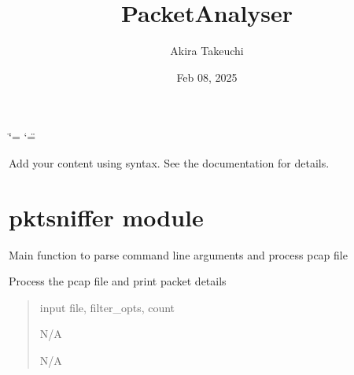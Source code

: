 \documentclass[letterpaper,10pt,english]{sphinxmanual}
\title{PacketAnalyser}
\date{Feb 08, 2025}
\author{Akira Takeuchi}
\begin{document}
\ifdefined\shorthandoff
  \ifnum\catcode`\=\string=\active\shorthandoff{=}\fi
  \ifnum\catcode`\"=\active{}\fi
\fi

\pagestyle{empty}
\sphinxmaketitle
\pagestyle{plain}
\sphinxtableofcontents
\pagestyle{normal}
\label{\detokenize{index::doc}}


\sphinxAtStartPar
Add your content using  syntax. See the
documentation for details.

\sphinxstepscope


\chapter{pktsniffer module}
\label{\detokenize{pktsniffer:module-pktsniffer}}\label{\detokenize{pktsniffer:pktsniffer-module}}\label{\detokenize{pktsniffer::doc}}

\begin{fulllineitems}
\label{\detokenize{pktsniffer:pktsniffer.main}}
\pysigstartsignatures
\pysiglinewithargsret
{}
{}
{}
\pysigstopsignatures
\sphinxAtStartPar
Main function to parse command line arguments and process pcap file

\end{fulllineitems}


\begin{fulllineitems}
\label{\detokenize{pktsniffer:pktsniffer.process_pcap}}
\pysigstartsignatures
\pysiglinewithargsret
{}
{\sphinxparamcomma {}\sphinxparamcomma {}}
{}
\pysigstopsignatures
\sphinxAtStartPar
Process the pcap file and print packet details
\begin{quote}\begin{description}
\sphinxAtStartPar
{} \textendash{} input file, filter\_opts, count

\sphinxAtStartPar
N/A

\sphinxAtStartPar
N/A

\end{description}\end{quote}

\end{fulllineitems}
\end{document}
